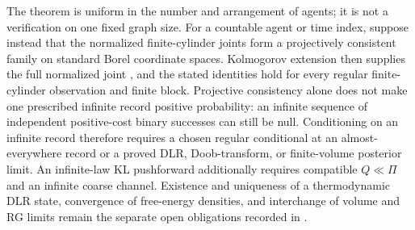 The theorem is uniform in the number and arrangement of agents; it is not a
verification on one fixed graph size.  For a countable agent or time index,
suppose instead that the normalized finite-cylinder joints form a projectively
consistent family on standard Borel coordinate spaces.  Kolmogorov extension
then supplies the full normalized joint \citep{Kallenberg2021}, and the stated
identities hold for every regular finite-cylinder observation and finite block.
Projective consistency alone does not make one prescribed infinite record
positive probability: an infinite sequence of independent positive-cost
binary successes can still be null.  Conditioning on an infinite record
therefore requires a chosen regular conditional at an almost-everywhere record
or a proved DLR, Doob-transform, or finite-volume posterior limit.  An
infinite-law KL pushforward additionally requires compatible
$Q\ll\Pi$ and an infinite coarse channel.  Existence and uniqueness of a
thermodynamic DLR state, convergence of free-energy densities, and interchange
of volume and RG limits remain the separate open obligations recorded in
.  
